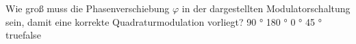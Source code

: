     {Wie groß muss die Phasenverschiebung $\varphi$ in der dargestellten Modulatorschaltung sein, damit eine korrekte Quadraturmodulation vorliegt?}
    {90 °}
    {180 °}
    {0 °}
    {45 °}
    {true}{false}